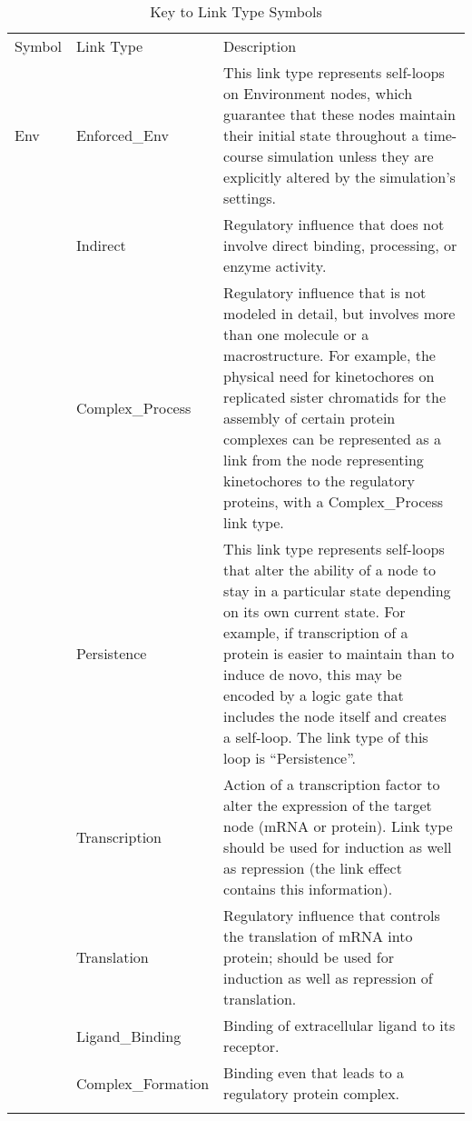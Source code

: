 \documentclass{article}
\begin{document}
\begin{subtables}
\begin{longtable}[c]{@{}llp{}@{}}
\caption{Key to Link Type Symbols}
\endhead{}\\
\toprule
Symbol&Link Type&Description\\
\midrule
{\footnotesize{}Env}&Enforced\_{}Env&This link type represents self-loops on Environment nodes, which guarantee that these nodes maintain their initial state throughout a time-course simulation unless they are explicitly altered by the simulation’s settings.\\\addlinespace[\dimexpr0.75\defaultaddspace]
{\footnotesize{}Ind}&Indirect&Regulatory influence that does not involve direct binding, processing, or enzyme activity.\\\addlinespace[\dimexpr0.75\defaultaddspace]
{\footnotesize{}ComplProc}&Complex\_{}Process&Regulatory influence that is not modeled in detail, but involves more than one molecule or a macrostructure. For example, the physical need for kinetochores on replicated sister chromatids for the assembly of certain protein complexes can be represented as a link from the node representing kinetochores to the regulatory proteins, with a Complex\_{}Process link type.\\\addlinespace[\dimexpr0.75\defaultaddspace]
{\footnotesize{}Per}&Persistence&This link type represents self-loops that alter the ability of a node to stay in a particular state depending on its own current state. For example, if transcription of a protein is easier to maintain than to induce de novo, this may be encoded by a logic gate that includes the node itself and creates a self-loop. The link type of this loop is “Persistence”.\\\addlinespace[\dimexpr0.75\defaultaddspace]
{\footnotesize{}TR}&Transcription&Action of a transcription factor to alter the expression of the target node (mRNA or protein). Link type should be used for induction as well as repression (the link effect contains this information).\\\addlinespace[\dimexpr0.75\defaultaddspace]
{\footnotesize{}TL}&Translation&Regulatory influence that controls the translation of mRNA into protein; should be used for induction as well as repression of translation.\\\addlinespace[\dimexpr0.75\defaultaddspace]
{\footnotesize{}Ligand}&Ligand\_{}Binding&Binding of extracellular ligand to its receptor.\\\addlinespace[\dimexpr0.75\defaultaddspace]
{\footnotesize{}Compl}&Complex\_{}Formation&Binding even that leads to a regulatory protein complex.\\

\end{longtable}
\end{subtables}
\end{document}
